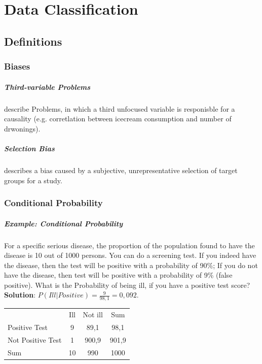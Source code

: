 \documentclass[11pt]{article}
\begin{document}
    \chapter{Data Classification}
    
    \section{Definitions}
    
    \subsection{Biases}
    
    \paragraph{Third-variable Problems}describe Problems, in which a third unfocused variable is responisble for a causality
    (e.g. corretlation between icecream consumption and number of drwonings).
    
    \paragraph{Selection Bias} describes a bias caused by a subjective, unrepresentative selection of target groups for a study.

    \subsection{Conditional Probability}
    
    \paragraph{Example: Conditional Probability} For a specific serious disease, the proportion of the population found to have the disease is 10 out of 1000 persons. 
    You can do a screening test. If you indeed have the disease, then the test will be positive with a probability of 90\%; If you do not have the disease, then test will be positive with a probability of 9\% (false positive). 
    What is the Probability of being ill, if you have a positive test score? \textbf{Solution}: $P(Ill|Positive) = \frac{9}{98,1} = 0,092$.\\

    \begin{tabular}{ l c c c }
        & Ill & Not ill & Sum \\
        Positive Test & 9 & 89,1 & 98,1 \\
        Not Positive Test & 1 & 900,9 & 901,9 \\
        Sum & 10 & 990 & 1000 \\
    \end{tabular}
\end{document}
